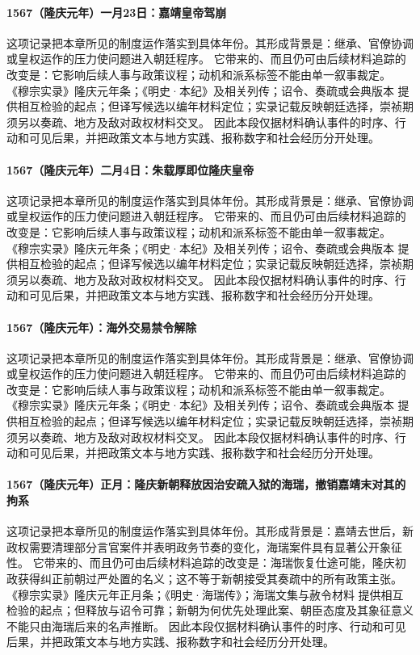 \paragraph{1567（隆庆元年）一月23日：嘉靖皇帝驾崩} 这项记录把本章所见的制度运作落实到具体年份。其形成背景是：继承、官僚协调或皇权运作的压力使问题进入朝廷程序。 它带来的、而且仍可由后续材料追踪的改变是：它影响后续人事与政策议程；动机和派系标签不能由单一叙事裁定。 《穆宗实录》隆庆元年条；《明史·本纪》及相关列传；诏令、奏疏或会典版本 提供相互检验的起点；但译写候选以编年材料定位；实录记载反映朝廷选择，崇祯期须另以奏疏、地方及敌对政权材料交叉。 因此本段仅据材料确认事件的时序、行动和可见后果，并把政策文本与地方实践、报称数字和社会经历分开处理。

\paragraph{1567（隆庆元年）二月4日：朱载厚即位隆庆皇帝} 这项记录把本章所见的制度运作落实到具体年份。其形成背景是：继承、官僚协调或皇权运作的压力使问题进入朝廷程序。 它带来的、而且仍可由后续材料追踪的改变是：它影响后续人事与政策议程；动机和派系标签不能由单一叙事裁定。 《穆宗实录》隆庆元年条；《明史·本纪》及相关列传；诏令、奏疏或会典版本 提供相互检验的起点；但译写候选以编年材料定位；实录记载反映朝廷选择，崇祯期须另以奏疏、地方及敌对政权材料交叉。 因此本段仅据材料确认事件的时序、行动和可见后果，并把政策文本与地方实践、报称数字和社会经历分开处理。

\paragraph{1567（隆庆元年）：海外交易禁令解除} 这项记录把本章所见的制度运作落实到具体年份。其形成背景是：继承、官僚协调或皇权运作的压力使问题进入朝廷程序。 它带来的、而且仍可由后续材料追踪的改变是：它影响后续人事与政策议程；动机和派系标签不能由单一叙事裁定。 《穆宗实录》隆庆元年条；《明史·本纪》及相关列传；诏令、奏疏或会典版本 提供相互检验的起点；但译写候选以编年材料定位；实录记载反映朝廷选择，崇祯期须另以奏疏、地方及敌对政权材料交叉。 因此本段仅据材料确认事件的时序、行动和可见后果，并把政策文本与地方实践、报称数字和社会经历分开处理。

\paragraph{1567（隆庆元年）正月：隆庆新朝释放因治安疏入狱的海瑞，撤销嘉靖末对其的拘系} 这项记录把本章所见的制度运作落实到具体年份。其形成背景是：嘉靖去世后，新政权需要清理部分言官案件并表明政务节奏的变化，海瑞案件具有显著公开象征性。 它带来的、而且仍可由后续材料追踪的改变是：海瑞恢复仕途可能，隆庆初政获得纠正前朝过严处置的名义；这不等于新朝接受其奏疏中的所有政策主张。 《穆宗实录》隆庆元年正月条；《明史·海瑞传》；海瑞文集与赦令材料 提供相互检验的起点；但释放与诏令可靠；新朝为何优先处理此案、朝臣态度及其象征意义不能只由海瑞后来的名声推断。 因此本段仅据材料确认事件的时序、行动和可见后果，并把政策文本与地方实践、报称数字和社会经历分开处理。

